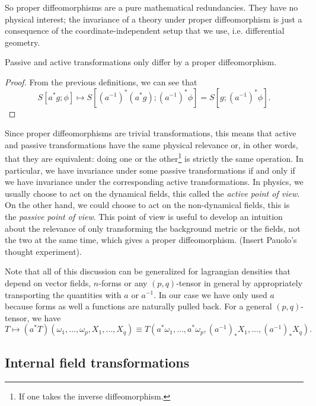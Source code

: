 \documentclass[a4paper,10pt]{article}
\begin{document}
        So proper diffeomorphisms are a pure mathematical redundancies. They have no physical interest; the invariance of a theory under proper diffeomorphism is just a consequence of the coordinate-independent setup that we use, i.e. differential geometry.

        \begin{prop}
            Passive and active transformations only differ by a proper diffeomorphism.
        \end{prop}
        \begin{proof}
            From the previous definitions, we can see that
        \begin{equation}
            S[a^*g;\phi]\mapsto S[(a^{-1})^*(a^*g);(a^{-1})^*\phi]=S[g;(a^{-1})^*\phi].
        \end{equation}
        \end{proof}
        Since proper diffeomorphisms are trivial transformations, this means that active and passive transformations have the same physical relevance or, in other words, that they are equivalent: doing one or the other\footnote{If one takes the inverse diffeomorphism.} is strictly the same operation. In particular, we have invariance under some passive transformations if and only if we have invariance under the corresponding active transformations. In physics, we usually choose to act on the dynamical fields, this called the \emph{active point of view}. On the other hand, we could choose to act on the non-dynamical fields, this is the \emph{passive point of view}. This point of view is useful to develop an intuition about the relevance of only transforming the background metric or the fields, not the two at the same time, which gives a proper diffeomorphism. (Insert Pauolo's thought experiment).
        
        Note that all of this discussion can be generalized for lagrangian densities that depend on vector fields, $n$-forms or any $(p,q)$-tensor in general by appropriately transporting the quantities with $a$ or $a^{-1}$. In our case we have only used $a$ because forms as well a functions are naturally pulled back. For a general $(p,q)$-tensor, we have
        \begin{equation}
            T\mapsto (a^*T)(\omega_1,\dots,\omega_p,X_1,\dots,X_q)\equiv T(a^*\omega_1,\dots,a^*\omega_p,(a^{-1})_*X_1,\dots,(a^{-1})_*X_q).
        \end{equation}

    \subsection{Internal field transformations}
\end{document}
